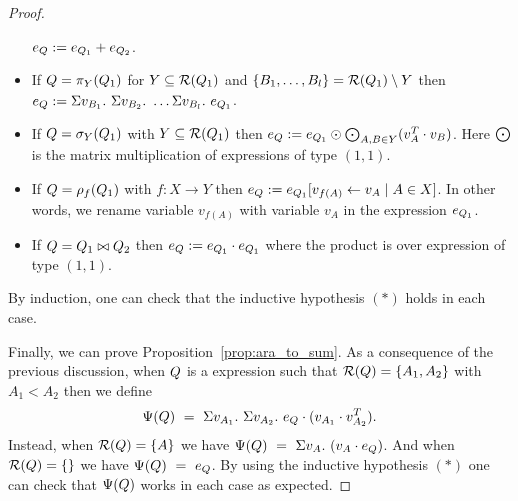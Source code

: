 \begin{proof}
\begin{itemize}
	$e_{Q}:=e_{Q_1} + e_{Q_2}$.
	\item If $Q=\pi_{Y}(Q_1)$ for $Y\subseteq \mathcal{R}(Q_1)$ and $\{B_1, \ldots, B_l\} = \mathcal{R}(Q_1) \setminus Y$ then
	$
	\earae:= \Sigma v_{B_1}. \ \Sigma v_{B_2}. \ \ldots \Sigma v_{B_l}. \ e_{\arae_1}
	$.
	\item If $Q=\sigma_{Y}(Q_1)$ with $Y\subseteq\mathcal{R}(Q_1)$ then
	$
	e_{Q}:=e_{Q_1} \odot \bigodot_{A,B\in Y} (v_{A}^T \cdot v_{B})
	$.
	Here $\bigodot$ is the matrix multiplication of expressions of type $(1,1)$.
	\item If $Q=\rho_{f}(Q_1)$ with $f: X \rightarrow Y$ then
	$e_{Q}:=e_{Q_1}[v_{f(A)} \gets v_A\mid A\in X]$.
	In other words, we rename variable $v_{f(A)}$ with variable $v_A$ in the expression $e_{Q_1}$. 
	\item If $Q=Q_1\bowtie Q_2$ then
	$e_{Q}:=e_{Q_1} \cdot e_{Q_1}$ where the product is over expression of type $(1,1)$.
\end{itemize}
By induction, one can check that the inductive hypothesis $(*)$ holds in each case. 

Finally, we can prove Proposition~\ref{prop:ara_to_sum}.
As a consequence of the previous discussion, when $Q$ is a \rak expression 
such that $\mathcal{R}(Q)=\{A_1,A_2\}$ with $A_1<A_2$ then we define
$$
\Psi(Q) \ = \ \Sigma v_{A_1}. \ \Sigma v_{A_2}. \ e_{Q} \cdot (v_{A_1} \cdot v_{A_2}^T). 
$$
Instead, when $\mathcal{R}(Q)=\{A\}$ we have $
\Psi(Q) \ = \ \Sigma v_{A}. \  (v_{A} \cdot e_{Q})$.
And when $\mathcal{R}(Q)=\{\}$ we have $
\Psi(Q) \ = \ e_{Q}
$.
By using the inductive hypothesis $(*)$ one can check that $\Psi(Q)$ works in each case as expected. 
\end{proof}
 